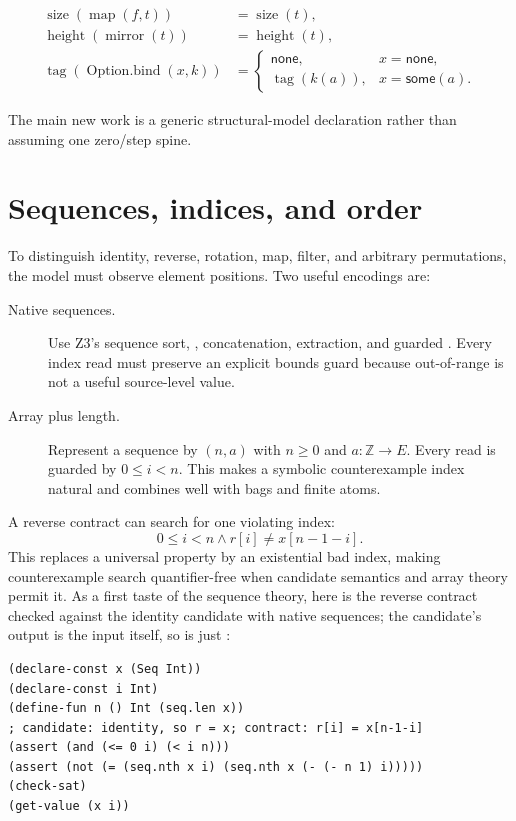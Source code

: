 \documentclass[10pt,letterpaper,oneside]{report}
\newcommand{\code}[1]{\texttt{\detokenize{#1}}}
\newcommand{\Int}{\mathbb{Z}}
\begin{document}
\begin{align*}
  \operatorname{size}(\operatorname{map}(f,t))&=\operatorname{size}(t),\\
  \operatorname{height}(\operatorname{mirror}(t))&=\operatorname{height}(t),\\
  \operatorname{tag}(\operatorname{Option.bind}(x,k))&=
    \begin{cases}
      \mathsf{none},&x=\mathsf{none},\\
      \operatorname{tag}(k(a)),&x=\mathsf{some}(a).
    \end{cases}
\end{align*}

The main new work is a generic structural-model declaration rather than assuming one zero/step spine.

\section{Sequences, indices, and order}

To distinguish identity, reverse, rotation, map, filter, and arbitrary permutations, the model must observe element positions. Two useful encodings are:

\begin{description}
\item[Native sequences.] Use Z3's sequence sort, \code{seq.len}, concatenation, extraction, and guarded \code{seq.nth}. Every index read must preserve an explicit bounds guard because out-of-range \code{seq.nth} is not a useful source-level value.

\item[Array plus length.] Represent a sequence by $(n,a)$ with $n\ge0$ and $a:\Int\to E$. Every read is guarded by $0\le i<n$. This makes a symbolic counterexample index natural and combines well with bags and finite atoms.
\end{description}

A reverse contract can search for one violating index:
\[
  0\le i<n\land r[i]\ne x[n-1-i].
\]
This replaces a universal property by an existential bad index, making counterexample search quantifier-free when candidate semantics and array theory permit it.
As a first taste of the sequence theory, here is the reverse contract checked against the identity candidate with native sequences; the candidate's output is the input itself, so \code{r} is just \code{x}:

\begin{lstlisting}[language=SMTLib,caption={One bad index refutes identity against the reverse contract.}]
(declare-const x (Seq Int))
(declare-const i Int)
(define-fun n () Int (seq.len x))
; candidate: identity, so r = x; contract: r[i] = x[n-1-i]
(assert (and (<= 0 i) (< i n)))
(assert (not (= (seq.nth x i) (seq.nth x (- (- n 1) i)))))
(check-sat)
(get-value (x i))
\end{lstlisting}
\end{document}
